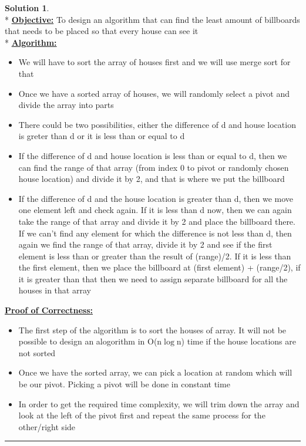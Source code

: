 \documentclass{article}
\theoremstyle{definition}
\def\fline{\rule{0.75\linewidth}{0.5pt}}
\newcommand{\finishline}{\vspace{-15pt}\begin{center}\fline\end{center}}
\newtheorem*{solution*}{Solution}
\newenvironment{solution}{\begin{solution*}}{{\finishline} \end{solution*}}
\begin{document}
\begin{solution}
	\hfill \bigskip\\*
	\textbf{\underline{Objective:}} To design an algorithm that can find the least amount of billboards that needs to be placed so that every house can see it\bigskip\\*
	\textbf{\underline{Algorithm:}}
	\begin{itemize}
		\item We will have to sort the array of houses first and we will use merge sort for that
		\item Once we have a sorted array of houses, we will randomly select a pivot and divide the array into parts
		\item There could be two possibilities, either the difference of d and house location is greter than d or it is less than or equal to d
		\item If the difference of d and house location is less than or equal to d, then we can find the range of that array (from index 0 to pivot or randomly chosen house location) and divide it by 2, and that is where we put the billboard
		\item If the difference of d and the house location is greater than d, then we move one element left and check again. If it is less than d now, then we can again take the range of that array and divide it by 2 and place the billboard there. If we can't find any element for which the difference is not less than d, then again we find the range of that array, divide it by 2 and see if the first element is less than or greater than the result of (range)/2. If it is less than the first element, then we place the billboard at (first element) + (range/2), if it is greater than that then we need to assign separate billboard for all the houses in that array
	\end{itemize} 
	\textbf{\underline{Proof of Correctness:}}
		\begin{itemize}
			\item The first step of the algorithm is to sort the houses of array. It will not be possible to design an alogorithm in O(n$\log$n) time if the house locations are not sorted
			\item Once we have the sorted array, we can pick a location at random which will be our pivot. Picking a pivot will be done in constant time
			\item In order to get the required time complexity, we will trim down the array and look at the left of the pivot first and repeat the same process for the other/right side

\end{itemize}
\end{solution}
\end{document}
